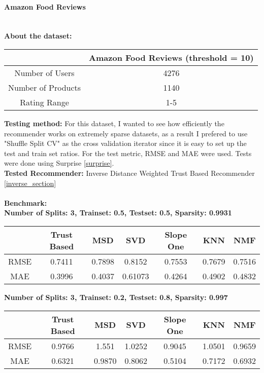 	\paragraph{Amazon Food Reviews \cite{Amazonfoodreviews}} \mbox{}\\
	\textbf{About the dataset:} 
	\begin{center}
		\begin{tabular}{ | c | c |}
			\hline
			&Amazon Food Reviews (threshold = 10)  \\  
			\hline
			Number of Users & 4276 \\
			\hline
			Number of Products & 1140 \\
			\hline
			Rating Range & 1-5 \\
			\hline
		\end{tabular}
	\end{center} 
	\vspace{0.5cm}
	\textbf{Testing method:} For this dataset, I wanted to see how efficiently the recommender works on extremely sparse datasets, as a result I prefered to use "Shuffle Split CV" as the cross validation iterator since it is easy to set up the test and train set ratios. For the test metric, RMSE and MAE were used. Tests were done using Surprise \ref{surprise}.\\
	\textbf{Tested Recommender:} Inverse Distance Weighted Trust Based Recommender \ref{inverse_section} \\ \\
	\textbf{Benchmark:} \\
	\textbf{Number of Splits: 3, Trainset: 0.5, Testset: 0.5, Sparsity: 0.9931}
	\begin{center}
		\begin{tabular}{ | c | c | c | c | c | c | c |}
			\hline
			& Trust Based & MSD & SVD & Slope One & KNN &  NMF\\ 
			\hline
			RMSE& 0.7411 & 0.7898&0.8152  & 0.7553& 0.7679&0.7516\\
			\hline
			MAE&0.3996 & 0.4037&0.61073 &0.4264  &0.4902 &0.4832\\
			\hline
		\end{tabular}
	\end{center} 
	\vspace{1cm}
	\textbf{Number of Splits: 3, Trainset: 0.2, Testset: 0.8, Sparsity: 0.997}
	\begin{center}
		\begin{tabular}{ | c | c | c | c | c | c | c |}
			\hline
			& Trust Based & MSD & SVD & Slope One & KNN & NMF\\ 
			\hline
			RMSE& 0.9766& 1.551& 1.0252&0.9045 & 1.0501& 0.9659\\
			\hline
			MAE& 0.6321& 0.9870& 0.8062&0.5104 & 0.7172& 0.6932\\
			\hline
		\end{tabular}
	\end{center} 
